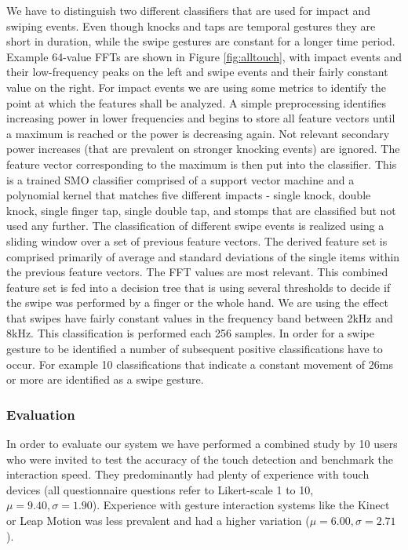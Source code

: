 We have to distinguish two different classifiers that are used for impact and swiping events. Even though knocks and taps are temporal gestures they are short in duration, while the swipe gestures are constant for a longer time period. Example 64-value FFTs are shown in Figure \ref{fig:alltouch}, with impact events and their low-frequency peaks on the left and swipe events and their fairly constant value on the right. For impact events we are using some metrics to identify the point at which the features shall be analyzed. A simple preprocessing identifies increasing power in lower frequencies and begins to store all feature vectors until a maximum is reached or the power is decreasing again. Not relevant secondary power increases (that are prevalent on stronger knocking events) are ignored. The feature vector corresponding to the maximum is then put into the classifier. This is a trained SMO classifier comprised of a support vector machine and a polynomial kernel that matches five different impacts - single knock, double knock, single finger tap, single double tap, and stomps that are classified but not used any further.
The classification of different swipe events is realized using a sliding window over a set of previous feature vectors. The derived feature set is comprised primarily of average and standard deviations of the single items within the previous feature vectors. The FFT values are most relevant. This combined feature set is fed into a decision tree that is using several thresholds to decide if the swipe was performed by a finger or the whole hand. We are using the effect that swipes have fairly constant values in the frequency band between 2kHz and 8kHz. This classification is performed each 256 samples. In order for a swipe gesture to be identified a number of subsequent positive classifications have to occur. For example 10 classifications that indicate a constant movement of 26ms or more are identified as a swipe gesture.

\subsubsection{Evaluation}
In order to evaluate our system we have performed a combined study by 10 users who were invited to test the accuracy of the touch detection and benchmark the interaction speed. They predominantly had plenty of experience with touch devices (all questionnaire questions refer to Likert-scale 1 to 10, $\mu=9.40, \sigma=1.90$). Experience with gesture interaction systems like the Kinect or Leap Motion was less prevalent and had a higher variation ($\mu=6.00, \sigma=2.71$).
 
